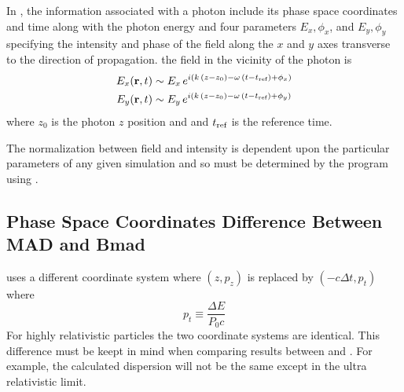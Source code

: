 In \bmad, the information associated with a photon include its phase
space coordinates and time along with the photon energy and four
parameters $E_x, \phi_x$, and $E_y, \phi_y$ specifying the intensity
and phase of the field along the $x$ and $y$ axes transverse to the
direction of propagation.  the field in the vicinity of the photon is
\begin{align}
  E_x ({\bf r}, t) &\sim E_x \, e^{i (k \, (z - z_0) - \omega \, (t - t_{\text{ref}}) + \phi_x)} \nonumber \\
  E_y ({\bf r}, t) &\sim E_y \, e^{i (k \, (z - z_0) - \omega \, (t - t_{\text{ref}}) + \phi_y)} 
  \label{ertee}
\end{align}
where $z_0$ is the photon $z$ position and and $t_{\text{ref}}$ is the reference time.

The normalization between field and intensity is dependent upon the
particular parameters of any given simulation and so must be
determined by the program using \bmad.

\subsection{Phase Space Coordinates Difference Between MAD and Bmad}

\mad uses a different coordinate system where $(z, p_z)$ is replaced by $(-c\Delta t, p_t)$ where
\begin{equation}
  p_t \equiv \frac{\Delta E}{P_0 c}
\end{equation}
For highly relativistic particles the two coordinate systems are identical.
This difference must be keept in mind when comparing results between \bmad and \mad. For example,
the calculated dispersion will not be the same except in the ultra relativistic limit.
